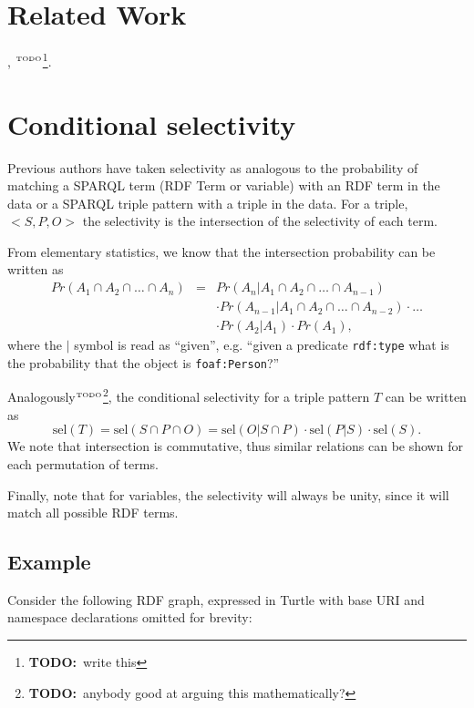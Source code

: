 \documentclass[12pt, draft]{article}
\newcommand{\rdfterm}[1]{\texttt{#1}}
\newcommand{\todo}[1]{\ensuremath{^{\textrm{\tiny{TODO}\normalsize}}}\footnote{\textbf{TODO:}~#1}}
\newcommand{\sel}[1]{\ensuremath{\mathrm{sel}\left(#1\right)}}
\begin{document}
\section{Related Work}

\cite{splendid}, \cite{wodqa} \todo{write this}.

\section{Conditional selectivity}\label{sec:cond}

Previous authors have taken selectivity as analogous to the
probability of matching a SPARQL term (RDF Term or variable) with an
RDF term in the data or a SPARQL triple pattern with a triple in the
data.  For a triple, $<S, P, O>$ the selectivity is the intersection
of the selectivity of each term.

From elementary statistics, we know that the intersection probability
can be written as
\begin{eqnarray}
Pr(A_1 \cap A_2  \cap \ldots \cap A_n) &=& 
  Pr(A_n | A_1 \cap A_2  \cap \ldots \cap A_{n-1}) \nonumber\\
  &&\cdot Pr(A_{n-1} | A_1 \cap A_2  \cap \ldots \cap A_{n-2}) \cdot \ldots \nonumber\\
  && \cdot Pr(A_2 | A_1) \cdot Pr(A_1) ,
\end{eqnarray}
where the $|$ symbol is read as ``given'', e.g. ``given a predicate
\rdfterm{rdf:type} what is the probability that the object is \rdfterm{foaf:Person}?''

Analogously\todo{anybody good at arguing this mathematically?}, the
conditional selectivity for a triple pattern $T$ can be written as 
\begin{equation}\label{eq:sel}
\sel{T} = \sel{S \cap P \cap O} = \sel{O | S \cap P} \cdot \sel{P | S}
\cdot \sel{S} . 
\end{equation}
We note that intersection is commutative, thus similar
relations can be shown for each permutation of terms.

Finally, note that for variables, the selectivity will always be
unity, since it will match all possible RDF terms.

\subsection{Example}\label{sec:example}

Consider the following RDF graph, expressed in Turtle with base URI
and namespace declarations omitted for brevity:
\end{document}
